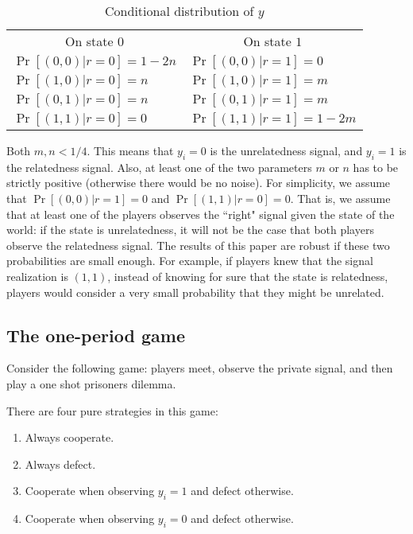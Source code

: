 \documentclass[12pt]{article}
\begin{document}
\begin{table}[h]
\center
\caption{Conditional distribution of $y$} \vspace{1ex} 
\begin{tabular}{|l|l|}
\multicolumn{1}{c}{On state $0$} & \multicolumn{1}{c}{On state $1$} \\
\cline{1-2}
$\Pr[(0,0)|r=0]=1-2n$ & $\Pr[(0,0)|r=1]=0$ \\
\cline{1-2}
$\Pr[(1,0)|r=0]=n$ & $\Pr[(1,0)|r=1]=m$ \\
\cline{1-2}
$\Pr[(0,1)|r=0]=n$ & $\Pr[(0,1)|r=1]=m$ \\
\cline{1-2}
$\Pr[(1,1)|r=0]=0$ & $\Pr[(1,1)|r=1]=1-2m$ \\
\cline{1-2}
\end{tabular}
\label{table:ycdist}
\end{table}

Both $m,n<1/4$. This means that $y_{i}=0$ is the unrelatedness signal, and $y_{i}=1$ is the relatedness signal. Also, at least one of the two parameters $m$ or $n$ has to be strictly positive (otherwise there would be no noise). For simplicity, we assume that  $\Pr[(0,0)|r=1]=0$ and $\Pr[(1,1)|r=0]=0$. That is, we assume that at least one of the players observes the ``right" signal given the state of the world:  if the state is unrelatedness, it will not be the case that both players observe the relatedness signal. The results of this paper are robust if these two probabilities are small enough. For example, if players knew that the signal realization is $(1,1)$, instead of knowing for sure that the state is relatedness, players would consider a very small probability that they might be unrelated.

\subsection{The one-period game}

Consider the following game:  players meet, observe the private signal, and then play a one shot prisoners dilemma. 

There are four pure strategies in this game:
\singlespacing
\begin{enumerate}
\item{Always cooperate.}
\item{Always defect.}
\item\label{kta}{Cooperate when observing $y_{i}=1$ and defect otherwise.}
\item{Cooperate when observing $y_{i}=0$ and defect otherwise.}
\end{enumerate}
\doublespacing
\end{document}
